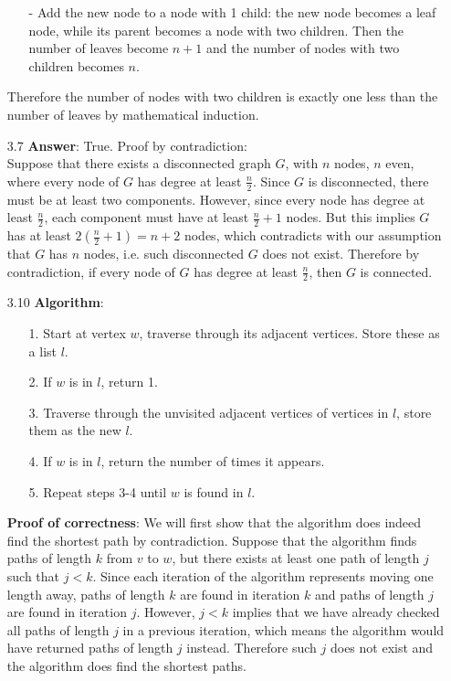 \documentclass{article}
\begin{document}
\begin{itemize}
\begin{itemize}
              \item [-] Add the new node to a node with 1 child: the new node becomes a leaf node, while its parent becomes a node with two children. Then the number of leaves become $n+1$ and the number of nodes with two children becomes $n$.
          \end{itemize}
          Therefore the number of nodes with two children is exactly one less than the number of leaves by mathematical induction.
    \item [3.7]
          \textbf{Answer}: True. Proof by contradiction:\\
          Suppose that there exists a disconnected graph $G$, with $n$ nodes, $n$ even, where every node of $G$ has degree at least $\frac{n}{2}$. Since $G$ is disconnected, there must be at least two components. However, since every node has degree at least $\frac{n}{2}$, each component must have at least $\frac{n}{2}+1$ nodes. But this implies $G$ has at least $2(\frac{n}{2}+1)=n+2$ nodes, which contradicts with our assumption that $G$ has $n$ nodes, i.e. such disconnected $G$ does not exist. Therefore by contradiction, if every node of $G$ has degree at least $\frac{n}{2}$, then $G$ is connected.
    \item [3.10]
          \textbf{Algorithm}:
          \begin{itemize}
              \item [1.] Start at vertex $w$, traverse through its adjacent vertices. Store these as a list $l$.
              \item [2.] If $w$ is in $l$, return 1.
              \item [3.] Traverse through the unvisited adjacent vertices of vertices in $l$, store them as the new $l$.
              \item [4.] If $w$ is in $l$, return the number of times it appears.
              \item [5.] Repeat steps 3-4 until $w$ is found in $l$.
          \end{itemize}
          \textbf{Proof of correctness}: We will first show that the algorithm does indeed find the shortest path by contradiction. Suppose that the algorithm finds paths of length $k$ from $v$ to $w$, but there exists at least one path of length $j$ such that $j<k$. Since each iteration of the algorithm represents moving one length away, paths of length $k$ are found in iteration $k$ and paths of length $j$ are found in iteration $j$. However, $j<k$ implies that we have already checked all paths of length $j$ in a previous iteration, which means the algorithm would have returned paths of length $j$ instead. Therefore such $j$ does not exist and the algorithm does find the shortest paths.\\

\end{itemize}
\end{document}
